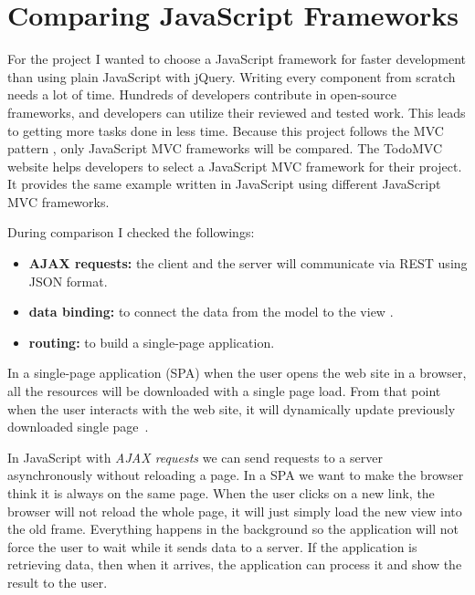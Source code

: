 \chapter{Comparing JavaScript Frameworks}
\label{comparing-frameworks}

For the project I wanted to choose a JavaScript framework for faster development than using plain JavaScript with jQuery. Writing every component from scratch needs a lot of time. Hundreds of developers contribute in open-source frameworks, and developers can utilize their reviewed and tested work. This leads to getting more tasks done in less time. Because this project follows the MVC pattern , only JavaScript MVC frameworks will be compared. The TodoMVC~\cite{TodoMVC} website helps developers to select a JavaScript MVC framework for their project. It provides the same example written in JavaScript using different JavaScript MVC frameworks.

During comparison I checked the followings:
\begin{itemize}
	\item \textbf{AJAX requests:} the client and the server  will communicate via REST using JSON format.
	\item \textbf{data binding:} to connect the data from the model to the view .
	\item \textbf{routing:} to build a single-page application.
\end{itemize}


In a single-page application (SPA) when the user opens the web site in a browser, all the resources will be downloaded with a single page load. From that point when the user interacts with the web site, it will dynamically update previously downloaded single page~\cite{SPA}.

In JavaScript with \emph{AJAX requests} we can send requests to a server asynchronously without reloading a page. In a SPA we want to make the browser think it is always on the same page. When the user clicks on a new link, the browser will not reload the whole page, it will just simply load the new view into the old frame. Everything happens in the background so the application will not force the user to wait while it sends data to a server. If the application is retrieving data, then when it arrives, the application can process it and show the result to the user.

